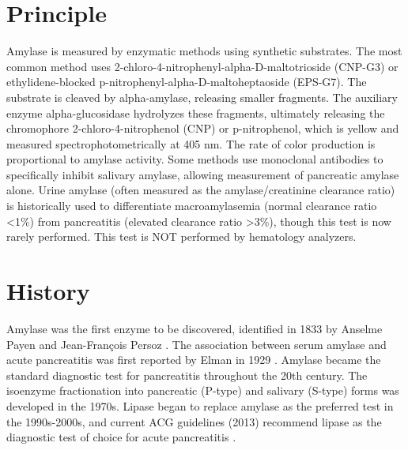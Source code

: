 \section*{Principle}
Amylase is measured by enzymatic methods using synthetic substrates. The most common method uses 2-chloro-4-nitrophenyl-alpha-D-maltotrioside (CNP-G3) or ethylidene-blocked p-nitrophenyl-alpha-D-maltoheptaoside (EPS-G7). The substrate is cleaved by alpha-amylase, releasing smaller fragments. The auxiliary enzyme alpha-glucosidase hydrolyzes these fragments, ultimately releasing the chromophore 2-chloro-4-nitrophenol (CNP) or p-nitrophenol, which is yellow and measured spectrophotometrically at 405 nm. The rate of color production is proportional to amylase activity. Some methods use monoclonal antibodies to specifically inhibit salivary amylase, allowing measurement of pancreatic amylase alone. Urine amylase (often measured as the amylase/creatinine clearance ratio) is historically used to differentiate macroamylasemia (normal clearance ratio <1\%) from pancreatitis (elevated clearance ratio >3\%), though this test is now rarely performed. This test is NOT performed by hematology analyzers.

\section*{History}
Amylase was the first enzyme to be discovered, identified in 1833 by Anselme Payen and Jean-Fran\c{c}ois Persoz \cite{payen1833diastase}. The association between serum amylase and acute pancreatitis was first reported by Elman in 1929 \cite{elman1929blood}. Amylase became the standard diagnostic test for pancreatitis throughout the 20th century. The isoenzyme fractionation into pancreatic (P-type) and salivary (S-type) forms was developed in the 1970s. Lipase began to replace amylase as the preferred test in the 1990s-2000s, and current ACG guidelines (2013) recommend lipase as the diagnostic test of choice for acute pancreatitis \cite{tenner2013american}.


